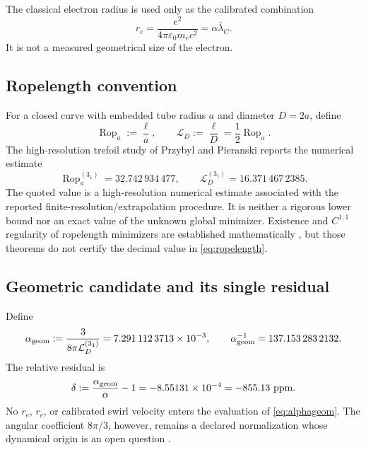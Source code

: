\documentclass[aps,pre,preprint,notitlepage,nofootinbib,superscriptaddress]{revtex4-2}
\newcommand{\lC}{\bar\lambda_C}
\newcommand{\re}{r_e}
\newcommand{\Rop}{\operatorname{Rop}}
\newcommand{\calL}{\mathcal L}
\begin{document}
The classical electron radius is used only as the calibrated combination
\[
\re=\frac{e^2}{4\pi\varepsilon_0m_ec^2}
=\alpha\lC.
\]
It is not a measured geometrical size of the electron.

\subsection{Ropelength convention}

For a closed curve with embedded tube radius \(a\) and diameter \(D=2a\), define
\begin{equation}
  \Rop_a:=\frac{\ell}{a},
  \qquad
  \calL_D:=\frac{\ell}{D}
  =\frac12\Rop_a.
  \label{eq:rope-conventions}
\end{equation}
The high-resolution trefoil study of Przybyl and Pieranski
\cite{PrzybylPieranski2014} reports the numerical estimate
\begin{equation}
  \Rop_a^{(3_1)}=32.742\,934\,477,
  \qquad
  \calL_D^{(3_1)}=16.371\,467\,2385.
  \label{eq:ropelength}
\end{equation}
The quoted value is a high-resolution numerical estimate associated with the reported finite-resolution/extrapolation procedure.  It is neither a rigorous lower bound nor an exact value of the unknown global minimizer.  Existence and \(C^{1,1}\) regularity of ropelength minimizers are established mathematically \cite{CantarellaKusnerSullivan2002}, but those theorems do not certify the decimal value in \cref{eq:ropelength}.

\subsection{Geometric candidate and its single residual}

Define
\begin{equation}
  \alpha_{\rm geom}
  :=\frac{3}{8\pi\calL_D^{(3_1)}}
  =7.291\,112\,3713\times10^{-3},
  \qquad
  \alpha_{\rm geom}^{-1}
  =137.153\,283\,2132.
  \label{eq:alphageom}
\end{equation}
The relative residual is
\begin{equation}
  \delta
  :=\frac{\alpha_{\rm geom}}{\alpha}-1
  =-8.55131\times10^{-4}
  =-855.13\ \mathrm{ppm}.
  \label{eq:residual}
\end{equation}
No \(r_e\), \(r_c\), or calibrated swirl velocity enters the evaluation of
\cref{eq:alphageom}.  The angular coefficient \(8\pi/3\), however, remains a declared normalization whose dynamical origin is an open question \cite{Iskandarani2026}.
\end{document}
